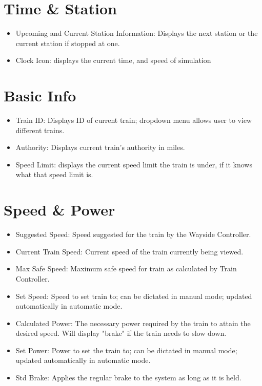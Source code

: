 \documentclass{scrreprt}
\begin{document}
\section{Time \& Station}
\begin{itemize}
	\item Upcoming and Current Station Information: Displays the next station or the current station if stopped at one.
	\item Clock Icon: displays the current time, and speed of simulation
\end{itemize}

\section{Basic Info}
\begin{itemize}
	\item Train ID: Displays ID of current train; dropdown menu allows user to view different trains.
	\item Authority: Displays current train's authority in miles.
	\item Speed Limit: displays the current speed limit the train is under, if it knows what that speed limit is.
\end{itemize}

\section{Speed \& Power}
\begin{itemize}
	\item Suggested Speed: Speed suggested for the train by the Wayside Controller.
	\item Current Train Speed: Current speed of the train currently being viewed.
	\item Max Safe Speed: Maximum safe speed for train as calculated by Train Controller.
	\item Set Speed: Speed to set train to; can be dictated in manual mode; updated automatically in automatic mode.
	\item Calculated Power: The necessary power required by the train to attain the desired speed. Will display "brake" if the train needs to slow down.
	\item Set Power: Power to set the train to; can be dictated in manual mode; updated automatically in automatic mode.
	\item Std Brake: Applies the regular brake to the system as long as it is held.
\end{itemize}
\end{document}
